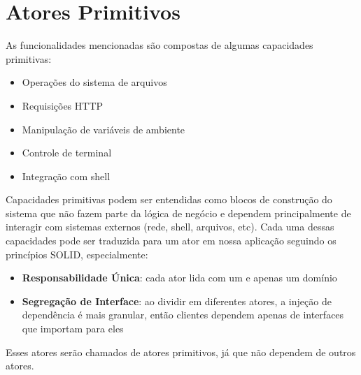 \section{Atores Primitivos}

As funcionalidades mencionadas são compostas de algumas capacidades primitivas:

\begin{itemize}
    \item Operações do sistema de arquivos
    \item Requisições HTTP
    \item Manipulação de variáveis de ambiente
    \item Controle de terminal
    \item Integração com shell
\end{itemize}

Capacidades primitivas podem ser entendidas como blocos de construção do sistema que não fazem parte da lógica de negócio e dependem principalmente de interagir com sistemas externos (rede, shell, arquivos, etc). Cada uma dessas capacidades pode ser traduzida para um ator em nossa aplicação seguindo os princípios SOLID, especialmente:

\begin{itemize}
    \item \textbf{Responsabilidade Única}: cada ator lida com um e apenas um domínio
    \item \textbf{Segregação de Interface}: ao dividir em diferentes atores, a injeção de dependência é mais granular, então clientes dependem apenas de interfaces que importam para eles
\end{itemize}

Esses atores serão chamados de atores primitivos, já que não dependem de outros atores.
